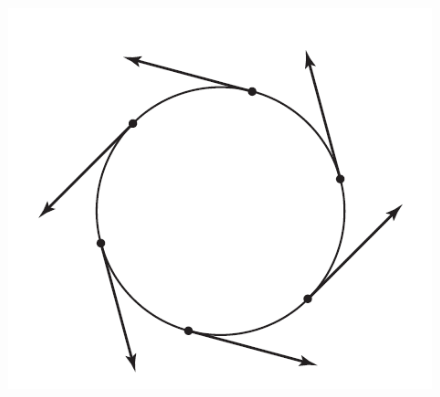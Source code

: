\documentclass[../main]{subfiles}
\begin{document}
\begin{figure}[ht]
    \centering
    \includegraphics[scale=0.5]{"../tex from old group/fig3.png"}
    \caption{}
    \label{fig:figure3}
\end{figure}
\end{document}
